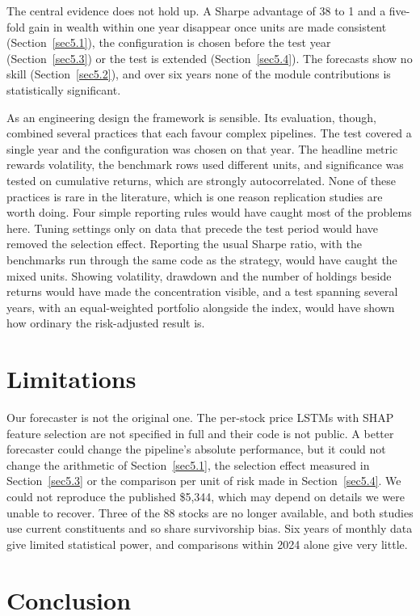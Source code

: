 The central evidence does not hold up. A Sharpe advantage of 38 to 1 and a five-fold gain in wealth within one year disappear once units are made consistent (Section~\ref{sec5.1}), the configuration is chosen before the test year (Section~\ref{sec5.3}) or the test is extended (Section~\ref{sec5.4}). The forecasts show no skill (Section~\ref{sec5.2}), and over six years none of the module contributions is statistically significant.

As an engineering design the framework is sensible. Its evaluation, though, combined several practices that each favour complex pipelines. The test covered a single year and the configuration was chosen on that year. The headline metric rewards volatility, the benchmark rows used different units, and significance was tested on cumulative returns, which are strongly autocorrelated. None of these practices is rare in the literature, which is one reason replication studies are worth doing. Four simple reporting rules would have caught most of the problems here. Tuning settings only on data that precede the test period would have removed the selection effect. Reporting the usual Sharpe ratio, with the benchmarks run through the same code as the strategy, would have caught the mixed units. Showing volatility, drawdown and the number of holdings beside returns would have made the concentration visible, and a test spanning several years, with an equal-weighted portfolio alongside the index, would have shown how ordinary the risk-adjusted result is.

\section{Limitations}\label{sec7}

Our forecaster is not the original one. The per-stock price LSTMs with SHAP feature selection are not specified in full and their code is not public. A better forecaster could change the pipeline's absolute performance, but it could not change the arithmetic of Section~\ref{sec5.1}, the selection effect measured in Section~\ref{sec5.3} or the comparison per unit of risk made in Section~\ref{sec5.4}. We could not reproduce the published \$5,344, which may depend on details we were unable to recover. Three of the 88 stocks are no longer available, and both studies use current constituents and so share survivorship bias. Six years of monthly data give limited statistical power, and comparisons within 2024 alone give very little.

\section{Conclusion}\label{sec8}

